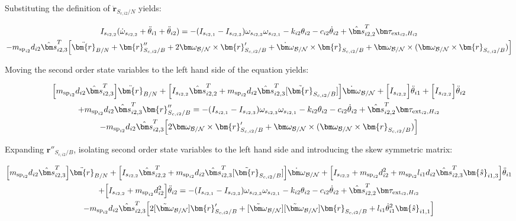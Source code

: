 \documentclass[paper]{aiaaNew}
\begin{document}
Substituting the definition of $\ddot{\bm r}_{S_{c,i2}/N}$ yields:

\begin{multline}
I_{s_{i2,2}} ( \dot\omega_{s_{i2,2}} + \ddot\theta_{i1} + \ddot\theta_{i2}) = - (I_{s_{i2,1}} - I_{s_{i2,3}}) \omega_{s_{i2,3}} \omega_{s_{i2,1}} - k_{i2} \theta_{i2} - c_{i2} \dot{\theta}_{i2} + \hat{\bm s}_{i2,2}^T \bm \tau_{\text{ext}_{i2},H_{i2}}  \\
-  m_{\text{sp}_{i2}} d_{i2} \hat{\bm s}_{i2,3}^T \Big[ \ddot{\bm{r}}_{B/N} + \bm{r}''_{S_{c,i2}/B} + 2 \bm\omega_{\cal B/N} \times \bm{r}'_{S_{c,i2}/B} +  \dot{\bm\omega}_{\cal B/N} \times \bm{r}_{S_{c,i2}/B} + \bm\omega_{\cal B/N} \times (\bm\omega_{\cal B/N} \times \bm{r}_{S_{c,i2}/B})\Big]
\end{multline}

Moving the second order state variables to the left hand side of the equation yields:

\begin{multline}
\Big[m_{\text{sp}_{i2}} d_{i2} \hat{\bm s}_{i2,3}^T\Big] \ddot{\bm{r}}_{B/N} + \Big[I_{s_{i2,2}} \hat{\bm s}_{i2,2}^T + m_{\text{sp}_{i2}} d_{i2} \hat{\bm s}_{i2,3}^T [\tilde{\bm{r}}_{S_{c,i2}/B}]\Big] \dot{\bm\omega}_{\cal B/N} + \Big[I_{s_{i2,2}}\Big] \ddot\theta_{i1} + \Big[I_{s_{i2,2}}\Big] \ddot\theta_{i2} \\
+ m_{\text{sp}_{i2}} d_{i2} \hat{\bm s}_{i2,3}^T  \bm{r}''_{S_{c,i2}/B} = - (I_{s_{i2,1}} - I_{s_{i2,3}}) \omega_{s_{i2,3}} \omega_{s_{i2,1}} - k_{i2} \theta_{i2} - c_{i2} \dot{\theta}_{i2} + \hat{\bm s}_{i2,2}^T \bm \tau_{\text{ext}_{i2},H_{i2}}  \\
-  m_{\text{sp}_{i2}} d_{i2} \hat{\bm s}_{i2,3}^T \Big[ 2 \bm\omega_{\cal B/N} \times \bm{r}'_{S_{c,i2}/B} + \bm\omega_{\cal B/N} \times (\bm\omega_{\cal B/N} \times \bm{r}_{S_{c,i2}/B})\Big]
\end{multline}

Expanding $\bm{r}''_{S_{c,i2}/B}$, isolating second order state variables to the left hand side and introducing the skew symmetric matrix:

\begin{multline}
\Big[m_{\text{sp}_{i2}} d_{i2} \hat{\bm s}_{i2,3}^T\Big] \ddot{\bm{r}}_{B/N} + \Big[I_{s_{i2,2}} \hat{\bm s}_{i2,2}^T + m_{\text{sp}_{i2}} d_{i2} \hat{\bm s}_{i2,3}^T [\tilde{\bm{r}}_{S_{c,i2}/B}]\Big] \dot{\bm\omega}_{\cal B/N} + \Big[I_{s_{i2,2}} + m_{\text{sp}_{i2}} d_{i2}^2 + m_{\text{sp}_{i2}} l_{i1} d_{i2} \hat{\bm s}_{i2,3}^T \bm{\hat{s}}_{i1,3} \Big] \ddot\theta_{i1} \\
+ \Big[I_{s_{i2,2}} + m_{\text{sp}_{i2}} d_{i2}^2 \Big] \ddot\theta_{i2} 
= - (I_{s_{i2,1}} - I_{s_{i2,3}}) \omega_{s_{i2,3}} \omega_{s_{i2,1}} - k_{i2} \theta_{i2} - c_{i2} \dot{\theta}_{i2} + \hat{\bm s}_{i2,2}^T \bm \tau_{\text{ext}_{i2},H_{i2}}  \\
-  m_{\text{sp}_{i2}} d_{i2} \hat{\bm s}_{i2,3}^T \Big[ 2 [\tilde{\bm\omega}_{\cal B/N}] \bm{r}'_{S_{c,i2}/B} + [\tilde{\bm\omega}_{\cal B/N}] [\tilde{\bm\omega}_{\cal B/N}] \bm{r}_{S_{c,i2}/B} + l_{i1} \dot{\theta}_{i1}^2 \bm{\hat{s}}_{i1,1} \Big]
\label{eq:sp2final}
\end{multline}
\end{document}
